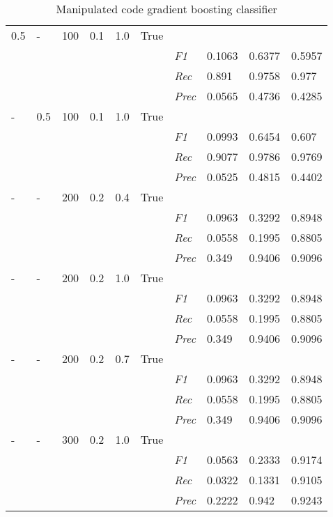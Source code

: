 \begin{table}[]
\begin{tabularx}{\textwidth}{XXXXXX|X|X|X|X}
    0.5 & - & 100 & 0.1 & 1.0 &True & & & & \\
    & & & & & & \textit{F1} & 0.1063 & 0.6377   & 0.5957     \\
    & & & & & & \textit{Rec} &  0.891 & 0.9758 & 0.977   \\
    & & & & & & \textit{Prec} & 0.0565 & 0.4736 & 0.4285 \\ \midrule
    - & 0.5 & 100 & 0.1 & 1.0 &True & & & & \\
    & & & & & & \textit{F1} & 0.0993 & 0.6454   & 0.607     \\
    & & & & & & \textit{Rec} &  0.9077 & 0.9786 & 0.9769   \\
    & & & & & & \textit{Prec} & 0.0525 & 0.4815 & 0.4402 \\ \midrule
    - & - & 200 & 0.2 & 0.4 &True & & & & \\
    & & & & & & \textit{F1} & 0.0963 & 0.3292   & 0.8948     \\
    & & & & & & \textit{Rec} &  0.0558 & 0.1995 & 0.8805   \\
    & & & & & & \textit{Prec} & 0.349 & 0.9406 & 0.9096 \\ \midrule
    - & - & 200 & 0.2 & 1.0 &True & & & & \\
    & & & & & & \textit{F1} & 0.0963 & 0.3292   & 0.8948     \\
    & & & & & & \textit{Rec} &  0.0558 & 0.1995 & 0.8805   \\
    & & & & & & \textit{Prec} & 0.349 & 0.9406 & 0.9096 \\ \midrule
    - & - & 200 & 0.2 & 0.7 &True & & & & \\
    & & & & & & \textit{F1} & 0.0963 & 0.3292   & 0.8948     \\
    & & & & & & \textit{Rec} &  0.0558 & 0.1995 & 0.8805   \\
    & & & & & & \textit{Prec} & 0.349 & 0.9406 & 0.9096 \\ \midrule
    - & - & 300 & 0.2 & 1.0 &True & & & & \\
    & & & & & & \textit{F1} & 0.0563 & 0.2333   & 0.9174     \\
    & & & & & & \textit{Rec} &  0.0322 & 0.1331 & 0.9105   \\
    & & & & & & \textit{Prec} & 0.2222 & 0.942 & 0.9243 \\ \midrule
    \end{tabularx}
    \caption{Manipulated code gradient boosting classifier}
    \label{tab:rq3_gradient_boosting_classifier}
    \end{table}
    
